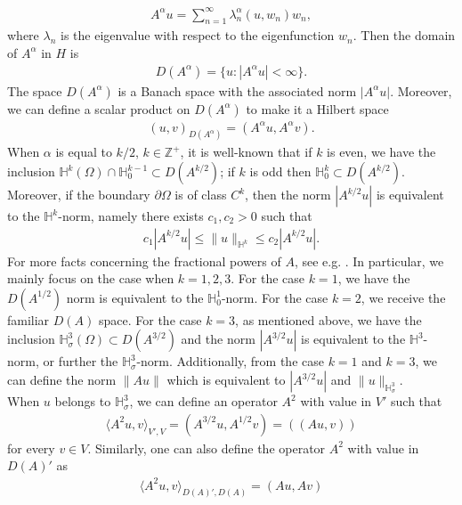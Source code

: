 \documentclass[reqno]{amsart}
\begin{document}
	\begin{align*}
		A^\alpha u = \sum_{n=1}^\infty \lambda^{\alpha}_n(u,w_n)w_n,
	\end{align*}
	where $\lambda_n$ is the eigenvalue with respect to the eigenfunction $w_n$. Then the domain of $A^\alpha$ in $H$ is
	\begin{align*}
		D(A^\alpha) = \{u: |A^\alpha u|<\infty\}.
	\end{align*}
	The space $D(A^\alpha)$ is a Banach space with the associated norm $\vert A^\alpha u \vert$. Moreover, we can define a scalar product on $D(A^\alpha)$ to make it a Hilbert space 
	\begin{align*}
		(u,v)_{D(A^{\alpha})} = (A^\alpha u, A^\alpha v).
	\end{align*}
	When $\alpha$ is equal to $k/2$, $k \in \mathbb{Z}^+$, it is well-known that if $k$ is even, we have the inclusion $\mathbb{H}^k(\Omega) \cap \mathbb{H}^{k-1}_0 \subset D(A^{k/2})$; if $k$ is odd then $\mathbb{H}^k_0 \subset D(A^{k/2})$. Moreover, if the boundary $\partial\Omega$ is of class $C^k$, then the norm $|A^{k/2}u|$ is equivalent to the $\mathbb{H}^k$-norm, namely there exists $c_1,c_2>0$ such that
	\begin{align*}
		c_1|A^{k/2}u|\leq \|u\|_{\mathbb{H}^k}\leq c_2|A^{k/2}u|.
	\end{align*}
	For more facts concerning the fractional powers of $A$, see e.g. \cite{robinson2003}. In particular, we mainly focus on the case when $k=1,2,3$. For the case $k=1$, we have the $D(A^{1/2})$ norm is equivalent to the $\mathbb{H}^1_0$-norm. For the case $k=2$, we receive the familiar $D(A)$ space. For the case $k=3$, as mentioned above, we have the inclusion $\mathbb{H}^3_\sigma(\Omega) \subset D(A^{3/2})$ and the norm $|A^{3/2}u|$ is equivalent to the $\mathbb{H}^3$-norm, or further the $\mathbb{H}^3_{\sigma}$-norm. Additionally, from the case $k=1$ and $k=3$, we can define the norm $\|Au\|$ which is equivalent to $|A^{3/2}u|$ and $\|u\|_{\mathbb{H}^3_\sigma}$.\\
	When $u$ belongs to $\mathbb{H}^3_{\sigma}$, we can define an operator $A^2$ with value in $V'$ such that
	\begin{align*}
		\langle A^2u,v\rangle_{V',V} = (A^{3/2}u,A^{1/2}v) = ((Au,v))
	\end{align*}
	for every $v\in V$. Similarly, one can also define the operator $A^2$ with value in $D(A)'$ as
	\begin{align*}
		\langle A^2u,v\rangle_{D(A)',D(A)} = (Au,Av)
	\end{align*}
\end{document}
